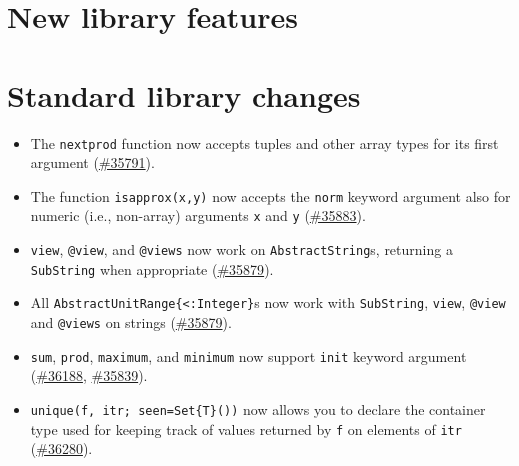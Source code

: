\hypertarget{7948362685613917540}{}


\chapter{New library features}



\hypertarget{10359018140604250447}{}


\chapter{Standard library changes}



\begin{itemize}
\item The \texttt{nextprod} function now accepts tuples and other array types for its first argument (\href{https://github.com/JuliaLang/julia/issues/35791}{\#35791}).


\item The function \texttt{isapprox(x,y)} now accepts the \texttt{norm} keyword argument also for numeric (i.e., non-array) arguments \texttt{x} and \texttt{y} (\href{https://github.com/JuliaLang/julia/issues/35883}{\#35883}).


\item \texttt{view}, \texttt{@view}, and \texttt{@views} now work on \texttt{AbstractString}s, returning a \texttt{SubString} when appropriate (\href{https://github.com/JuliaLang/julia/issues/35879}{\#35879}).


\item All \texttt{AbstractUnitRange\{<:Integer\}}s now work with \texttt{SubString}, \texttt{view}, \texttt{@view} and \texttt{@views} on strings (\href{https://github.com/JuliaLang/julia/issues/35879}{\#35879}).


\item \texttt{sum}, \texttt{prod}, \texttt{maximum}, and \texttt{minimum} now support \texttt{init} keyword argument (\href{https://github.com/JuliaLang/julia/issues/36188}{\#36188}, \href{https://github.com/JuliaLang/julia/issues/35839}{\#35839}).


\item \texttt{unique(f, itr; seen=Set\{T\}())} now allows you to declare the container type used for keeping track of values returned by \texttt{f} on elements of \texttt{itr} (\href{https://github.com/JuliaLang/julia/issues/36280}{\#36280}).

\end{itemize}


